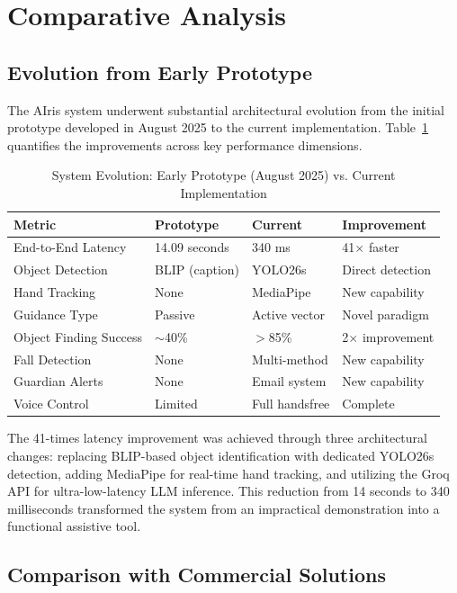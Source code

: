 \documentclass[12pt,a4paper]{report}
\begin{document}
\section{Comparative Analysis}

\subsection{Evolution from Early Prototype}

The AIris system underwent substantial architectural evolution from the initial prototype developed in August 2025 to the current implementation. Table~\ref{tab:evolution_comparison} quantifies the improvements across key performance dimensions.

\begin{table}[H]
\centering
\caption{System Evolution: Early Prototype (August 2025) vs. Current Implementation}
\label{tab:evolution_comparison}
\begin{tabular}{@{}llll@{}}
\toprule
\textbf{Metric} & \textbf{Prototype} & \textbf{Current} & \textbf{Improvement} \\ \midrule
End-to-End Latency & 14.09 seconds & 340 ms & 41$\times$ faster \\
Object Detection & BLIP (caption) & YOLO26s & Direct detection \\
Hand Tracking & None & MediaPipe & New capability \\
Guidance Type & Passive & Active vector & Novel paradigm \\
Object Finding Success & $\sim$40\% & $>$85\% & 2$\times$ improvement \\
Fall Detection & None & Multi-method & New capability \\
Guardian Alerts & None & Email system & New capability \\
Voice Control & Limited & Full handsfree & Complete \\ \bottomrule
\end{tabular}
\end{table}

The 41-times latency improvement was achieved through three architectural changes: replacing BLIP-based object identification with dedicated YOLO26s detection, adding MediaPipe for real-time hand tracking, and utilizing the Groq API for ultra-low-latency LLM inference. This reduction from 14 seconds to 340 milliseconds transformed the system from an impractical demonstration into a functional assistive tool.

\subsection{Comparison with Commercial Solutions}
\end{document}
